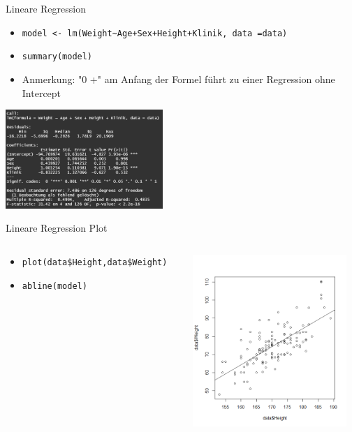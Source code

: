 \documentclass[xcolor=dvipsnames, aspectratio = 169]{beamer}
\begin{document}
\begin{frame}[fragile]{Lineare Regression}
	\begin{itemize}
		\item \verb"model <- lm(Weight~Age+Sex+Height+Klinik, data =data)"
		\item \verb+summary(model)+
		\item Anmerkung: "0 +" am Anfang der Formel führt zu einer Regression ohne Intercept 
	\end{itemize}
			
	\begin{center}
		\includegraphics[height=3.75cm]{LinearRegressionSummary}
	\end{center}
\end{frame}

\begin{frame}[fragile]{Lineare Regression Plot}
	\begin{columns}[T]
		\begin{column}{0.6\textwidth}
			\begin{itemize}
				\item \verb+plot(data$Height,data$Weight)+
				\item \verb+abline(model)+
			\end{itemize}
		\end{column}
		\begin{column}{0.4\textwidth}
			\includegraphics[height=6.5cm]{LinearRegressionPlot}
		\end{column}
	\end{columns}
\end{frame}
\end{document}
